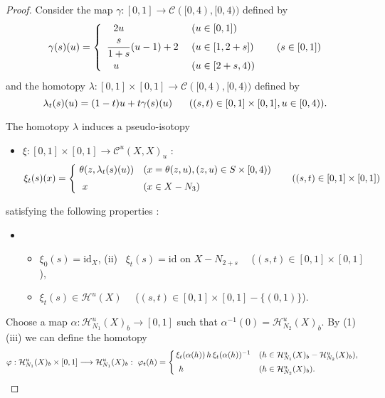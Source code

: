 \documentclass[11pt, fleqn]{amsart}
\theoremstyle{definition}
\newcommand{\ds}{\displaystyle}
\newcommand{\cal}{\mathcal}
\renewcommand{\phi}{\varphi}
\newcommand{\lra}{\longrightarrow}
\newcommand{\id}{\mathrm{id}}
\begin{document}
\begin{proof} 
Consider the map $\gamma : [0, 1] \lra {\cal C}([0, 4), [0,4))$ defined by 
\vspace*{1mm}   
$$\gamma(s)(u) 
= \left\{ 
\begin{array}[c]{ll}
\ \ 2 u & (u \in [0, 1]) \\[1.5mm]
\ds \frac{s}{1+s}(u-1) + 2 \ & (u \in [1, 2+s]) \\[2.5mm] 
\ \ u & (u \in [2+s, 4))
\end{array} \right. \hspace{5mm} (s \in [0, 1])$$ 
\vskip 1mm 
\noindent and the homotopy $\lambda : [0, 1] \times [0,1] \lra {\cal C}([0, 4), [0,4))$ defined by 
$$\lambda_t(s)(u) = (1-t)u + t \gamma(s)(u) \hspace{6mm} ((s,t) \in [0, 1] \times [0,1], u \in [0, 4)).$$

The homotopy $\lambda$ induces a pseudo-isotopy  
\begin{itemize}
\item[] $\xi : [0, 1] \times [0,1] \lra {\cal C}^u(X, X)_u$ : 
\vspace{1mm} 
$$\xi_t(s)(x) = \left\{ 
\begin{array}[c]{@{\ }ll}
\theta(z, \lambda_t(s)(u)) & (x = \theta(z,u), (z,u) \in S \times [0,4)) \\[2mm] 
\ x & (x \in X - N_3)
\end{array}\right. 
\hspace{5mm} ((s,t) \in [0, 1] \times [0,1])$$ 
\end{itemize} 
\vskip 1mm 
satisfying the following properties : 
\begin{itemize}
\item[(1)] 
\begin{itemize}
\item[(i)\ ] $\xi_0(s) = \id_X$, \hspace{5mm} (ii) \ $\xi_t(s) = \id$ on $X - N_{2+s}$ \ \ ($(s,t) \in [0, 1] \times [0,1]$), 
\item[(iii)] $\xi_t(s) \in {\cal H}^u(X)$ \ \ ($(s,t) \in [0,1] \times [0,1] - \{ (0,1) \}$). 
\end{itemize} 
\end{itemize} 

Choose a map $\alpha : {\cal H}^u_{N_1}(X)_b \to [0,1]$ such that $\alpha^{-1}(0) = {\cal H}^u_{N_2}(X)_b$. 
By (1)(iii) we can define the homotopy 
\vspace{1mm} 
$$\phi : {\cal H}^u_{N_1}(X)_b \times [0,1] \lra {\cal H}^u_{N_1}(X)_b : \ 
\phi_t(h) = 
\left\{ \begin{array}[c]{@{\,}ll}
\xi_t(\alpha(h)) \, h \,\xi_t(\alpha(h))^{-1} & (h \in {\cal H}^u_{N_1}(X)_b - {\cal H}^u_{N_2}(X)_b),  \\[2mm] 
\ h & (h \in {\cal H}^u_{N_2}(X)_b). 
\end{array} \right.$$ 



\end{proof}
\end{document}

